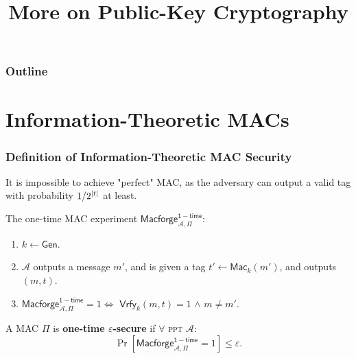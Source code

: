 

\title{More on Public-Key Cryptography}


\maketitle
\begin{frame}
\frametitle{Outline}
\tableofcontents
\end{frame}

\section{Information-Theoretic MACs}

\begin{frame}\frametitle{Definition of Information-Theoretic MAC Security}
It is impossible to achieve "perfect" MAC, as the adversary can output a valid tag with probability $1/2^{\lvert t\rvert}$ at least.
\newline

The one-time MAC experiment $\mathsf{Macforge}^{\mathsf{1-time}}_{\mathcal{A},\Pi }$:
\begin{enumerate}
\item $k \gets \mathsf{Gen}$.
\item $\mathcal{A}$ outputs a message $m'$, and is given a tag $t' \gets \mathsf{Mac}_k(m')$, and outputs $(m,t)$.
\item $\mathsf{Macforge}^{\mathsf{1-time}}_{\mathcal{A},\Pi }=1 \iff$ $\mathsf{Vrfy}_k(m,t)=1$ $\land$ $m \neq m'$. 
\end{enumerate}
\begin{definition}
A MAC $\Pi$ is \textbf{one-time $\varepsilon$-secure} if $\forall$ \textsc{ppt} $\mathcal{A}$:
\[ \Pr [\mathsf{Macforge}^{\mathsf{1-time}}_{\mathcal{A},\Pi}=1] \le \varepsilon.
\]
\end{definition}
\end{frame}

